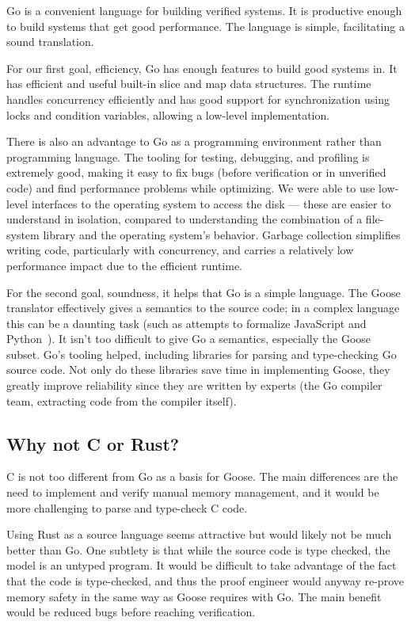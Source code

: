 Go is a convenient language for building verified systems. It is productive
enough to build systems that get good performance. The language is simple,
facilitating a sound translation.

For our first goal, efficiency, Go has enough features to build good systems
in. It has efficient and useful built-in slice and map data structures. The
runtime handles concurrency efficiently and has good support for synchronization
using locks and condition variables, allowing a low-level implementation.

There is also an advantage to Go as a programming environment rather than
programming language. The tooling for testing, debugging, and profiling is
extremely good, making it easy to fix bugs (before verification or in unverified
code) and find performance problems while optimizing. We were able to use
low-level interfaces to the operating system to access the disk --- these are
easier to understand in isolation, compared to understanding the combination of
a file-system library and the operating system's behavior. Garbage collection
simplifies writing code, particularly with concurrency, and carries a relatively
low performance impact due to the efficient runtime.

For the second goal, soundness, it helps that Go is a simple language. The Goose
translator effectively gives a semantics to the source code; in a complex
language this can be a daunting task (such as attempts to formalize JavaScript and
Python~\cite{guha:lambda-js,politz:python-semantics}). It isn't too
difficult to give Go a semantics, especially the Goose subset. Go's tooling
helped, including libraries for parsing and type-checking Go source code. Not
only do these libraries save time in implementing Goose, they greatly improve
reliability since they are written by experts (the Go compiler team, extracting
code from the compiler itself).

\subsection{Why not C or Rust?}

C is not too different from Go as a basis for Goose. The main differences are
the need to implement and verify manual memory management, and it would be more
challenging to parse and type-check C code.

Using Rust as a source language seems attractive but would likely not be much
better than Go. One subtlety is that while the source code is type checked, the
model is an untyped program. It would be difficult to take advantage of the fact
that the code is type-checked, and thus the proof engineer would anyway
re-prove memory safety in the same way as Goose requires with Go. The main
benefit would be reduced bugs before reaching verification.

